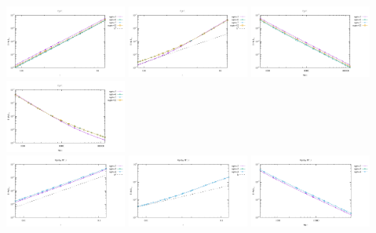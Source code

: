 \begin{center}
\\
\includegraphics[width=4cm]{python_codes/fieldstone_120/results/P2P1-velocity-h.pdf}
\includegraphics[width=4cm]{python_codes/fieldstone_120/results/P2P1-pressure-h.pdf}
\includegraphics[width=4cm]{python_codes/fieldstone_120/results/P2P1-velocity-Nfem.pdf}
\includegraphics[width=4cm]{python_codes/fieldstone_120/results/P2P1-pressure-Nfem.pdf}
\\
\includegraphics[width=4cm]{python_codes/fieldstone_120/results/RT1Q0-velocity-h.pdf}
\includegraphics[width=4cm]{python_codes/fieldstone_120/results/RT1Q0-pressure-h.pdf}
\includegraphics[width=4cm]{python_codes/fieldstone_120/results/RT1Q0-velocity-Nfem.pdf}

\end{center}
